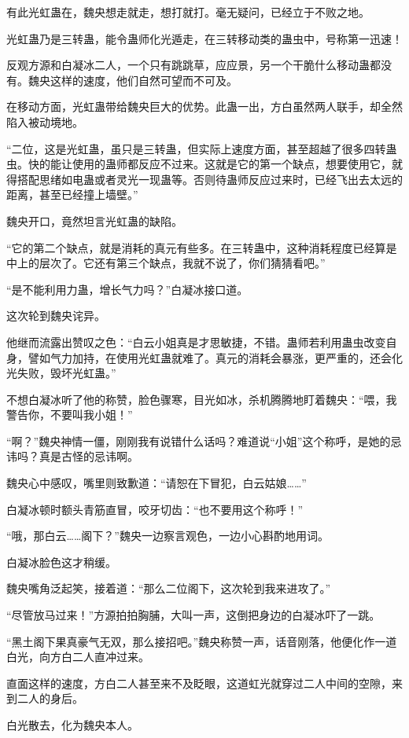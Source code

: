 \begin{this_body}
有此光虹蛊在，魏央想走就走，想打就打。毫无疑问，已经立于不败之地。

光虹蛊乃是三转蛊，能令蛊师化光遁走，在三转移动类的蛊虫中，号称第一迅速！

反观方源和白凝冰二人，一个只有跳跳草，应应景，另一个干脆什么移动蛊都没有。魏央这样的速度，他们自然可望而不可及。

在移动方面，光虹蛊带给魏央巨大的优势。此蛊一出，方白虽然两人联手，却全然陷入被动境地。

“二位，这是光虹蛊，虽只是三转蛊，但实际上速度方面，甚至超越了很多四转蛊虫。快的能让使用的蛊师都反应不过来。这就是它的第一个缺点，想要使用它，就得搭配思绪如电蛊或者灵光一现蛊等。否则待蛊师反应过来时，已经飞出去太远的距离，甚至已经撞上墙壁。”

魏央开口，竟然坦言光虹蛊的缺陷。

“它的第二个缺点，就是消耗的真元有些多。在三转蛊中，这种消耗程度已经算是中上的层次了。它还有第三个缺点，我就不说了，你们猜猜看吧。”

“是不能利用力蛊，增长气力吗？”白凝冰接口道。

这次轮到魏央诧异。

他继而流露出赞叹之色：“白云小姐真是才思敏捷，不错。蛊师若利用蛊虫改变自身，譬如气力加持，在使用光虹蛊就难了。真元的消耗会暴涨，更严重的，还会化光失败，毁坏光虹蛊。”

不想白凝冰听了他的称赞，脸色骤寒，目光如冰，杀机腾腾地盯着魏央：“喂，我警告你，不要叫我小姐！”

“啊？”魏央神情一僵，刚刚我有说错什么话吗？难道说“小姐”这个称呼，是她的忌讳吗？真是古怪的忌讳啊。

魏央心中感叹，嘴里则致歉道：“请恕在下冒犯，白云姑娘……”

白凝冰顿时额头青筋直冒，咬牙切齿：“也不要用这个称呼！”

“哦，那白云……阁下？”魏央一边察言观色，一边小心斟酌地用词。

白凝冰脸色这才稍缓。

魏央嘴角泛起笑，接着道：“那么二位阁下，这次轮到我来进攻了。”

“尽管放马过来！”方源拍拍胸脯，大叫一声，这倒把身边的白凝冰吓了一跳。

“黑土阁下果真豪气无双，那么接招吧。”魏央称赞一声，话音刚落，他便化作一道白光，向方白二人直冲过来。

直面这样的速度，方白二人甚至来不及眨眼，这道虹光就穿过二人中间的空隙，来到二人的身后。

白光散去，化为魏央本人。


\end{this_body}

